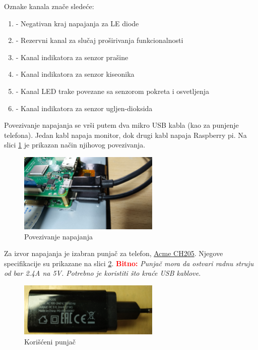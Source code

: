 \documentclass[a4paper]{article}
\def\bitno#1{\textbf{\textcolor{red}{Bitno:}} \textit{#1}}
\begin{document}
	Oznake kanala zna\v ce slede\' ce:
	\begin{enumerate}
		\item \say{\texttt{-}} - Negativan kraj napajanja za LE diode
		\item {} - Rezervni kanal za slu\v caj pro\v sirivanja funkcionalnosti
		\item {} - Kanal indikatora za senzor pra\v sine
		\item {} - Kanal indikatora za senzor kiseonika
		\item {} - Kanal LED trake povezane sa senzorom pokreta i osvetljenja
		\item {} - Kanal indikatora za senzor ugljen-dioksida
	\end{enumerate}
	
	Povezivanje napajanja se vr\v si putem dva mikro USB kabla (kao za punjenje telefona). Jedan kabl napaja
	monitor, dok drugi kabl napaja Raspberry pi. Na slici \ref{fig:power} je prikazan na\v cin njihovog 	
	povezivanja.
	\begin{figure}[H]
		\centering
		\includegraphics[width=0.6\textwidth]{graphics/USB.jpg}
		\caption{Povezivanje napajanja}
		\label{fig:power}		
	\end{figure}	
	
	Za izvor napajanja je izabran punja\v c za telefon, \href{https://www.gigatron.rs/punjaci_za_mobilne_telefone/acme_ch205_wall_charger_-_a504597-173419?recommender_box_placement=productpage_similar&recommender_box=quarticon}{Acme CH205}. Njegove specifikacije
	su prikazane na slici \ref{fig:charger}. \bitno{Punja\v c mora da ostvari radnu struju od bar 2.4A na 5V.
	Potrebno je koristiti \v sto kra\' ce USB kablove}.
	\begin{figure}[H]
		\centering
		\includegraphics[width=0.6\textwidth]{graphics/charger.jpg}
		\caption{Kori\v s\' ceni punja\v c}
		\label{fig:charger}	
	\end{figure}
\end{document}
